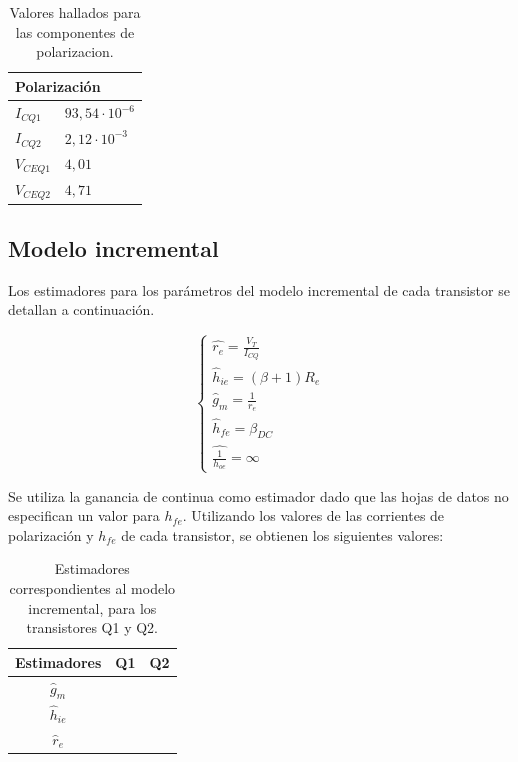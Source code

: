 \begin{table}[H]
	\centering
\begin{tabular}{ll}
\multicolumn{2}{l}{Polarización} \\ \hline
$I_{CQ1}$          & $93,54\cdot 10^{-6} $       \\
$I_{CQ2}$        & $2,12\cdot 10^{-3} $        \\
$V_{CEQ1}$         & $4,01$       \\
$V_{CEQ2}$         & $4,71  $      
\end{tabular}
\caption{Valores hallados para las componentes de polarizacion.}
\label{tabla_valores_polarizacion}  
\end{table}


	\subsection{Modelo incremental}
	
	Los estimadores para los parámetros del modelo incremental de cada transistor se detallan a continuación.

		\begin{equation}
			\begin{cases}
			\widehat{r_{e}}=\frac{V_{T}}{I_{CQ}}\\
			{\widehat{h}_{ie}}=(\beta+1)R_{e}\\	
			{\widehat{g}_m}=\frac{1}{r_{e}}\\
			{\widehat{h}_{fe}}= \beta_{DC}\\
			\widehat{\frac{1}{h_{oe}}}= \infty
			\end{cases}
			\label{mod_inc_ecs}
		\end{equation}
		
	Se utiliza la ganancia de continua como estimador dado que las hojas de datos no especifican un valor para $h_{fe}$. Utilizando los valores de las corrientes de polarización y $h_{fe}$ de cada transistor, se obtienen los siguientes valores:
	
	\begin{table}[h!]
		\centering
		\begin{tabular}{c c c}%
			\bfseries Estimadores & Q1 & Q2 \\ \hline
			$\widehat{g}_m$ &  & \\
			$\widehat{h}_{ie}$ &  & \\
			$\widehat{r}_{e}$&  & \\
			\hline
		\end{tabular}
		\caption{Estimadores correspondientes al modelo incremental, para los transistores Q1 y Q2.}
		\label{avolf}
	\end{table}
	
